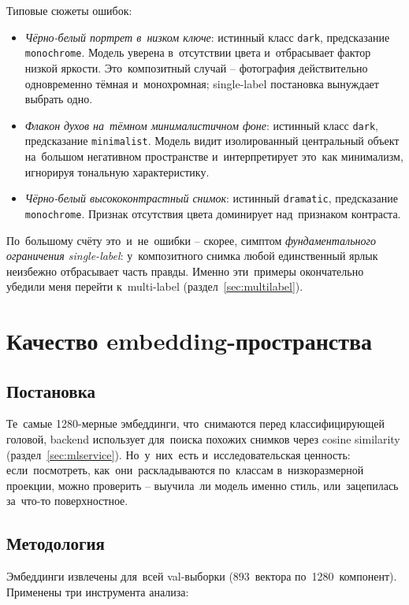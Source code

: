 \documentclass[a4paper,12pt]{diplom}
\begin{document}
Типовые сюжеты ошибок:
\begin{itemize}
\item \emph{Чёрно-белый портрет в~низком ключе}: истинный класс \texttt{dark}, предсказание \texttt{monochrome}. Модель уверена в~отсутствии цвета и~отбрасывает фактор низкой яркости. Это~композитный случай -- фотография действительно одновременно тёмная и~монохромная; single-label постановка вынуждает выбрать одно.
\item \emph{Флакон духов на~тёмном минималистичном фоне}: истинный класс \texttt{dark}, предсказание \texttt{minimalist}. Модель видит изолированный центральный объект на~большом негативном пространстве и~интерпретирует это~как минимализм, игнорируя тональную характеристику.
\item \emph{Чёрно-белый высококонтрастный снимок}: истинный \texttt{dramatic}, предсказание \texttt{monochrome}. Признак отсутствия цвета доминирует над~признаком контраста.
\end{itemize}

По~большому счёту это~и~не~ошибки -- скорее, симптом \emph{фундаментального ограничения single-label}: у~композитного снимка любой единственный ярлык неизбежно отбрасывает часть правды. Именно эти~примеры окончательно убедили меня перейти к~multi-label (раздел~\ref{sec:multilabel}).

\section{Качество embedding-пространства}
\label{sec:embed_quality}

\subsection{Постановка}

Те~самые 1280-мерные эмбеддинги, что~снимаются перед классифицирующей головой, backend использует для~поиска похожих снимков через cosine similarity (раздел~\ref{sec:mlservice}). Но~у~них~есть и~исследовательская ценность: если~посмотреть, как~они~раскладываются по~классам в~низкоразмерной проекции, можно проверить -- выучила~ли модель именно стиль, или~зацепилась за~что-то поверхностное.

\subsection{Методология}

Эмбеддинги извлечены для~всей val-выборки (893~вектора по~1280~компонент). Применены три инструмента анализа:
\end{document}
